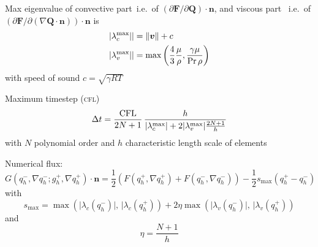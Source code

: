Max eigenvalue of convective part \maxConvEigen\,i.e.\ of $\left( \partial \bm{F}/\partial \bm{Q}\right) \cdot \bm{n}$,
and viscous part \maxViscEigen\, i.e.\ of $\left( \partial \bm{F}/\partial \left( \nabla \bm{Q} \cdot \bm{n} \right)\right) \cdot \bm{n}$
is
\begin{align}
  \vert \lambda_c^{\text{max}} \vert \vert  &= \Vert \bm{v} \Vert + c\\
  \vert \lambda_v^{\text{max}} \vert \vert &= \max \left( \frac{4}{3} \frac{\mu}{\rho}
                                       , \frac{\gamma \mu}{\Pr \rho} \right)
\end{align}
with speed of sound $c = \sqrt{\gamma R T }$

Maximum timestep (\textsc{cfl})
\begin{equation}
 \Delta t = \frac{\text{CFL}}{2N + 1} \, \frac{h}{\vert \lambda_c^{\text{max}} \vert + 2 \vert \lambda_v^{\text{max}} \vert \frac{2N+1}{h}}
\end{equation}
with $N$ polynomial order and $h$ characteristic length scale of elements

Numerical flux:
\begin{equation}
  \label{eq:rusanov-flux}
  G(q_h^-, \nabla q_h^-; g_h^+, \nabla q_h^+) \cdot \bm{n} =
  \frac{1}{2} \left(
    F(q_h^+, \nabla q_h^+) +
    F(q_h^-, \nabla q_h^-)
  \right) -
  \frac{1}{2} s_\text{max} (q_h^+ - q_h^-)
\end{equation}
with
\begin{equation}
  \label{eq:parabolic-penalty}
  s_\text{max}  = \max \left(
\vert \lambda_c(q_h^-) \vert, \, \vert \lambda_c(q_h^+)
\right) +
2 \eta \max \left(
\vert \lambda_v(q_h^-) \vert, \, \vert \lambda_v(q_h^+)
\right)
\end{equation}
and
\begin{equation}
  \eta = \frac{N+1}{h}
\end{equation}

